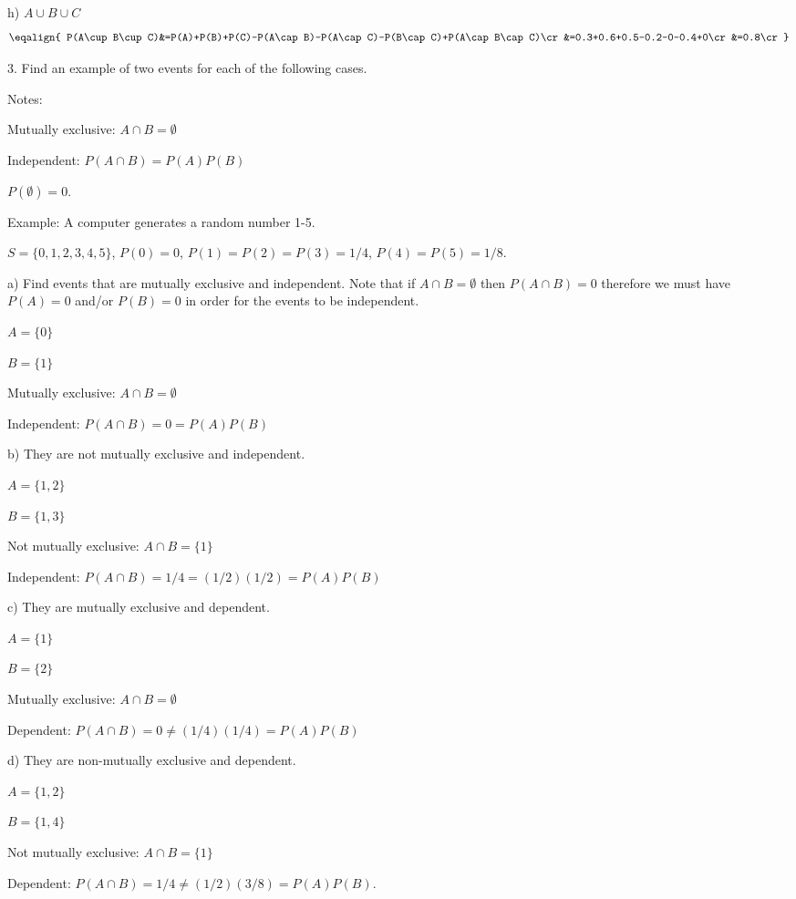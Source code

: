 \bigskip
h) $A\cup B\cup C$
$$\eqalign{
P(A\cup B\cup C)&=P(A)+P(B)+P(C)-P(A\cap B)-P(A\cap C)-P(B\cap C)+P(A\cap B\cap C)\cr
&=0.3+0.6+0.5-0.2-0-0.4+0\cr
&=0.8\cr
}$$

\vfill
\eject

3. Find an example of two events for each of the following cases.

\bigskip
Notes:\par
Mutually exclusive: $A\cap B=\emptyset$\par
Independent: $P(A\cap B)=P(A)P(B)$\par
$P(\emptyset)=0$.

\bigskip
Example: A computer generates a random number 1-5.\par
$S=\{0,1,2,3,4,5\}$, $P(0)=0$, $P(1)=P(2)=P(3)=1/4$, $P(4)=P(5)=1/8$.

\bigskip
a) Find events that are mutually exclusive and independent.
Note that if
$A\cap B=\emptyset$ then $P(A\cap B)=0$ therefore we must have
$P(A)=0$ and/or $P(B)=0$ in order for the events to be independent.\par
$A=\{0\}$\par
$B=\{1\}$\par
Mutually exclusive: $A\cap B=\emptyset$\par
Independent: $P(A\cap B)=0=P(A)P(B)$

\bigskip
b) They are not mutually exclusive and independent.\par
$A=\{1,2\}$\par
$B=\{1,3\}$\par
Not mutually exclusive: $A\cap B=\{1\}$\par
Independent: $P(A\cap B)=1/4=(1/2)(1/2)=P(A)P(B)$

\bigskip
c) They are mutually exclusive and dependent.\par
$A=\{1\}$\par
$B=\{2\}$\par
Mutually exclusive: $A\cap B=\emptyset$\par
Dependent: $P(A\cap B)=0\ne(1/4)(1/4)=P(A)P(B)$

\bigskip
d) They are non-mutually exclusive and dependent.\par
$A=\{1,2\}$\par
$B=\{1,4\}$\par
Not mutually exclusive: $A\cap B=\{1\}$\par
Dependent: $P(A\cap B)=1/4\ne(1/2)(3/8)=P(A)P(B)$.

\vfill
\eject

